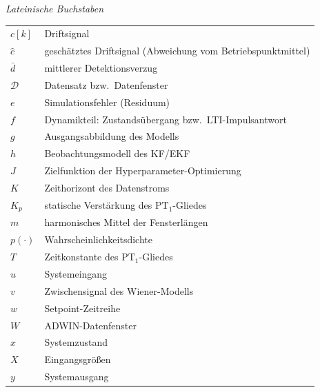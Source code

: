 \noindent\textit{Lateinische Buchstaben}
\begin{longtable}{@{}p{}p{}@{}}
    $c[k]$        & Driftsignal \\                                       %
    $\hat{c}$     & geschätztes Driftsignal (Abweichung vom Betriebspunktmittel) \\
    $\bar{d}$     & mittlerer Detektionsverzug \\
    $\mathcal{D}$ & Datensatz bzw.\ Datenfenster \\
    $e$           & Simulationsfehler (Residuum) \\                      %
    $f$           & Dynamikteil: Zustandsübergang bzw.\ LTI-Impulsantwort \\
    $g$           & Ausgangsabbildung des Modells \\                     %
    $h$           & Beobachtungsmodell des KF/EKF \\
    $J$           & Zielfunktion der Hyperparameter-Optimierung \\       %
    $K$           & Zeithorizont des Datenstroms \\
    $K_p$         & statische Verstärkung des $\mathrm{PT}_1$-Gliedes \\
    $m$           & harmonisches Mittel der Fensterlängen \\
    $p(\cdot)$    & Wahrscheinlichkeitsdichte \\                         %
    $T$           & Zeitkonstante des $\mathrm{PT}_1$-Gliedes \\         %
    $u$           & Systemeingang \\                                     %
    $v$           & Zwischensignal des Wiener-Modells \\
    $w$           & Setpoint-Zeitreihe \\                                %
    $W$           & ADWIN-Datenfenster \\                                %
    $x$           & Systemzustand \\
    $X$           & Eingangsgrößen \\
    $y$           & Systemausgang \\                                     %
\end{longtable}

